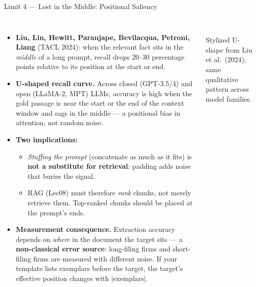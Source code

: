 \begin{frame}{Limit 4 --- Lost in the Middle: Positional Saliency}
\begin{columns}[T]
\footnotesize
\begin{itemize}
\item \textbf{Liu, Lin, Hewitt, Paranjape, Bevilacqua, Petroni, Liang} (TACL 2024): when the relevant fact sits in the \emph{middle} of a long prompt, recall drops 20--30 percentage points relative to its position at the start or end.

\medskip
\item \textbf{U-shaped recall curve.} Across closed (GPT-3.5/4) and open (LLaMA-2, MPT) LLMs, accuracy is high when the gold passage is near the start or the end of the context window and sags in the middle --- a positional bias in attention, not random noise.

\medskip
\item \textbf{Two implications:}
\begin{itemize}
    \item \emph{Stuffing the prompt} (concatenate as much as it fits) is \textbf{not a substitute for retrieval}: padding adds noise that buries the signal.
    \item RAG (Lec08) must therefore \emph{rank} chunks, not merely retrieve them. Top-ranked chunks should be placed at the prompt's ends.
\end{itemize}

\medskip
\item \textbf{Measurement consequence.} Extraction accuracy depends on \emph{where} in the document the target sits --- a \textbf{non-classical error source}: long-filing firms and short-filing firms are measured with different noise. If your template lists exemplars before the target, the target's effective position changes with $|\text{exemplars}|$.
\end{itemize}

\centering
{}\\
{\scriptsize Stylized U-shape from Liu et al.\ (2024); same qualitative pattern across model families.}
\end{columns}
\end{frame}

